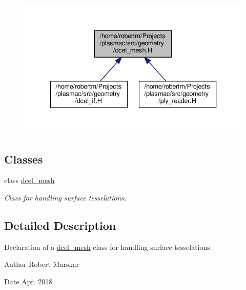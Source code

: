 \begin{figure}[H]
\begin{center}
\leavevmode
\includegraphics[width=336pt]{dcel__mesh_8H__dep__incl}
\end{center}
\end{figure}
\subsection*{Classes}
\begin{DoxyCompactItemize}
\item 
class \hyperlink{classdcel__mesh}{dcel\+\_\+mesh}
\begin{DoxyCompactList}\small\item\em Class for handling surface tesselations. \end{DoxyCompactList}\end{DoxyCompactItemize}


\subsection{Detailed Description}
Declaration of a \hyperlink{classdcel__mesh}{dcel\+\_\+mesh} class for handling surface tesselations. 

\begin{DoxyAuthor}{Author}
Robert Marskar 
\end{DoxyAuthor}
\begin{DoxyDate}{Date}
Apr. 2018 
\end{DoxyDate}
